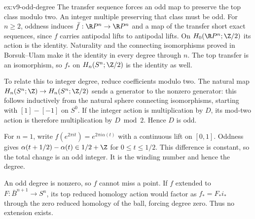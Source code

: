 \begin{solution}{ex:v9-odd-degree}
\idea The transfer sequence forces an odd map to preserve the top class modulo two. An integer multiple preserving that class must be odd.
\writeup For $n\ge2$, oddness induces $\bar f:\R P^n\to\R P^n$ and a map of the transfer short exact sequences, since $f$ carries antipodal lifts to antipodal lifts. On $H_0(\R P^n;\Z/2)$ its action is the identity. Naturality and the connecting isomorphisms proved in Borsuk--Ulam make it the identity in every degree through $n$. The top transfer is an isomorphism, so $f_*$ on $H_n(S^n;\Z/2)$ is the identity as well.

To relate this to integer degree, reduce coefficients modulo two. The natural map $H_n(S^n;\Z)\to H_n(S^n;\Z/2)$ sends a generator to the nonzero generator: this follows inductively from the natural sphere connecting isomorphisms, starting with $[1]-[-1]$ on $S^0$. If the integer action is multiplication by $D$, its mod-two action is therefore multiplication by $D\bmod2$. Hence $D$ is odd.

For $n=1$, write $f(e^{2\pi it})=e^{2\pi i\alpha(t)}$ with a continuous lift on $[0,1]$. Oddness gives $\alpha(t+1/2)-\alpha(t)\in1/2+\Z$ for $0\le t\le1/2$. This difference is constant, so the total change is an odd integer. It is the winding number and hence the degree.

An odd degree is nonzero, so $f$ cannot miss a point. If $f$ extended to $F:\bar B^{n+1}\to S^n$, its top reduced homology action would factor as $f_*=F_*i_*$ through the zero reduced homology of the ball, forcing degree zero. Thus no extension exists.
\end{solution}

